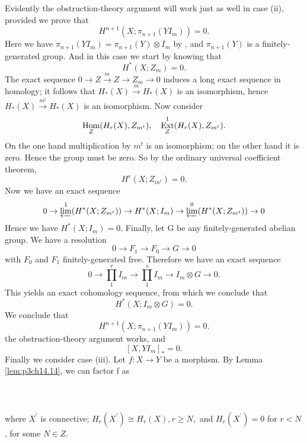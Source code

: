 \documentclass[../main]{subfiles}
\begin{document}
Evidently the obstruction-theory argument will work just as well in case (ii), provided we prove that 
$$
H^{n+1}(X;\pi_{n+1}(YI_{m}))=0
.$$
Here we have $\pi_{n+1}(YI_{m})=\pi_{n+1}(Y)\otimes I_{m}$ by , and $\pi_{n+1}(Y)$ is a finitely-generated group. And in this case we start by knowing that 
$$
  H^\ast(X;Z_{m})=0.
$$ 
The exact sequence $0 \to Z \xrightarrow{m} Z \to Z_{m} \to 0 $ induces a long exact sequence in homology; it follows that $H_{\ast}(X) \xrightarrow{m} H_{\ast}(X) $ is an isomorphism, hence $H_{\ast}(X) \xrightarrow{m^t}  H_{\ast}(X)$ is an isomorphism. Now consider 
$$
\mathop{\mathrm{Hom}}_{Z} (H_{r}(X), Z_{m^t}), \quad \mathop{\mathrm{Ext}}^1_{Z}(H_{r}(X),Z_{m^t}).
$$ 
On the one hand multiplication by $m^t$ is an isomorphism; on the other hand it is zero. Hence the group must be zero. So by the ordinary universal coefficient theorem, 
 $$
  H^r(X;Z_{m^t}) = 0.
$$ 
Now we have an exact sequence 
$$
  0 \to \varprojlim^1 (H^\ast(X;Z_{m^t})) \to H^\ast(X;I_{m}) \to \varprojlim^0(H^\ast(X;Z_{m^t})) \to 0
$$ 
Hence we have $H^\ast(X;I_{m})=0$. Finally, let G be any finitely-generated abelian group. We have a resolution
$$
  0 \to F_1 \to F_0 \to G \to 0
$$ 
with $F_0$ and $F_1$ finitely-generated free. Therefore we have an exact sequence 
$$
  0 \to \prod_{1}^{r} I_{m} \to \prod_{1}^{s} I_{m} \to I_{m} \otimes G \to 0.  
$$ 
This yields an exact cohomology sequence, from which we conclude that 
$$
  H^\ast(X;I_{m} \otimes G)=0.
$$ 
We conclude that 
$$
H^{n+1}(X;\pi_{n+1}(YI_{m}))=0.
$$ 
the obstruction-theory argument works, and 
$$
  \left[X,YI_{m}\right]_{\ast}=0.
$$ 
Finally we consider case (iii). Let $f\colon  X \to  Y $ be a morphism. By Lemma \ref{lem:p3ch14.14}, we can factor f as 
~\\~\\
~\\~\\
where $X^{\prime}$ is connective; $H_{r}(X^{\prime}) \cong H_{r}(X), r \ge N, $ and $H_{r}(X^{\prime}) =0$ for $r < N$, for some  $N \in Z$.
\end{document}
